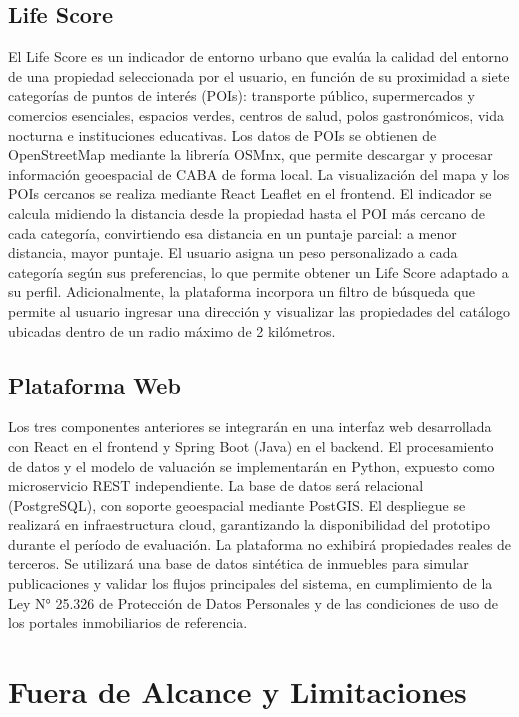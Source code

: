 \subsection{Life Score}

El Life Score es un indicador de entorno urbano que evalúa la calidad del entorno de una propiedad seleccionada por el usuario, en función de su proximidad a siete categorías de puntos de interés (POIs): transporte público, supermercados y comercios esenciales, espacios verdes, centros de salud, polos gastronómicos, vida nocturna e instituciones educativas. Los datos de POIs se obtienen de OpenStreetMap mediante la librería OSMnx, que permite descargar y procesar información geoespacial de CABA de forma local. La visualización del mapa y los POIs cercanos se realiza mediante React Leaflet en el frontend. El indicador se calcula midiendo la distancia desde la propiedad hasta el POI más cercano de cada categoría, convirtiendo esa distancia en un puntaje parcial: a menor distancia, mayor puntaje. El usuario asigna un peso personalizado a cada categoría según sus preferencias, lo que permite obtener un Life Score adaptado a su perfil. Adicionalmente, la plataforma incorpora un filtro de búsqueda que permite al usuario ingresar una dirección y visualizar las propiedades del catálogo ubicadas dentro de un radio máximo de 2 kilómetros.

\subsection{Plataforma Web}

Los tres componentes anteriores se integrarán en una interfaz web desarrollada con React en el frontend y Spring Boot (Java) en el backend. El procesamiento de datos y el modelo de valuación se implementarán en Python, expuesto como microservicio REST independiente. La base de datos será relacional (PostgreSQL), con soporte geoespacial mediante PostGIS. El despliegue se realizará en infraestructura cloud, garantizando la disponibilidad del prototipo durante el período de evaluación. La plataforma no exhibirá propiedades reales de terceros. Se utilizará una base de datos sintética de inmuebles para simular publicaciones y validar los flujos principales del sistema, en cumplimiento de la Ley N° 25.326 de Protección de Datos Personales \parencite{ArgentinaLey25326} y de las condiciones de uso de los portales inmobiliarios de referencia.

\section{Fuera de Alcance y Limitaciones}


